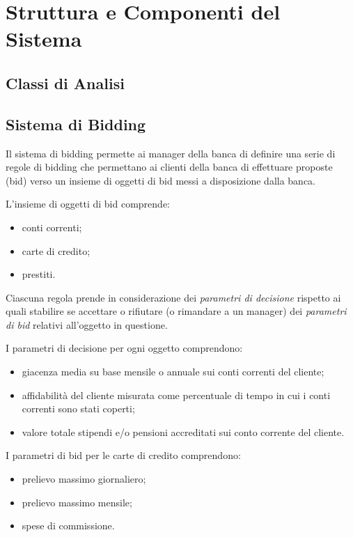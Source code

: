 
\section{Struttura e Componenti del Sistema}

\subsection{Classi di Analisi}



\subsection{Sistema di Bidding}

Il sistema di bidding permette ai manager della banca di definire una serie di regole di bidding che permettano ai clienti della banca di effettuare proposte (bid) verso un insieme di oggetti di bid messi a disposizione dalla banca.

L'insieme di oggetti di bid comprende:
\begin{itemize}
	\item conti correnti;
	\item carte di credito;
	\item prestiti.
\end{itemize}

Ciascuna regola prende in considerazione dei \emph{parametri di decisione} rispetto ai quali stabilire se accettare o rifiutare (o rimandare a un manager) dei \emph{parametri di bid} relativi all'oggetto in questione.

I parametri di decisione per ogni oggetto comprendono:
\begin{itemize}
	\item giacenza media su base mensile o annuale sui conti correnti del cliente;

	\item affidabilità del cliente misurata come percentuale di tempo in cui i conti correnti sono stati coperti;

	\item valore totale stipendi e/o pensioni accreditati sui conto corrente del cliente.
\end{itemize}

I parametri di bid per le carte di credito comprendono:
\begin{itemize}
	\item prelievo massimo giornaliero;

	\item prelievo massimo mensile;

	\item spese di commissione.
\end{itemize}

